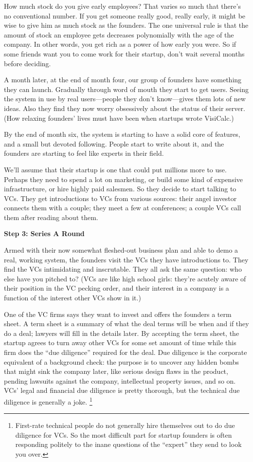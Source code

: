 \documentclass[12pt]{book}
\begin{document}
How much stock do you give early employees? That varies so much that
there's no conventional number. If you get someone really good, really
early, it might be wise to give him as much stock as the founders. The
one universal rule is that the amount of stock an employee gets
decreases polynomially with the age of the company. In other words, you
get rich as a power of how early you were. So if some friends want you
to come work for their startup, don't wait several months before
deciding.

A month later, at the end of month four, our group of founders have
something they can launch. Gradually through word of mouth they start to
get users. Seeing the system in use by real users---people they don't
know---gives them lots of new ideas. Also they find they now worry
obsessively about the status of their server. (How relaxing founders'
lives must have been when startups wrote VisiCalc.)

By the end of month six, the system is starting to have a solid core of
features, and a small but devoted following. People start to write about
it, and the founders are starting to feel like experts in their field.

We'll assume that their startup is one that could put millions more to
use. Perhaps they need to spend a lot on marketing, or build some kind
of expensive infrastructure, or hire highly paid salesmen. So they
decide to start talking to VCs. They get introductions to VCs from
various sources: their angel investor connects them with a couple; they
meet a few at conferences; a couple VCs call them after reading about
them.

\textbf{Step 3: Series A Round}

Armed with their now somewhat fleshed-out business plan and able to demo
a real, working system, the founders visit the VCs they have
introductions to. They find the VCs intimidating and inscrutable. They
all ask the same question: who else have you pitched to? (VCs are like
high school girls: they're acutely aware of their position in the VC
pecking order, and their interest in a company is a function of the
interest other VCs show in it.)

One of the VC firms says they want to invest and offers the founders a
term sheet. A term sheet is a summary of what the deal terms will be
when and if they do a deal; lawyers will fill in the details later. By
accepting the term sheet, the startup agrees to turn away other VCs for
some set amount of time while this firm does the ``due diligence''
required for the deal. Due diligence is the corporate equivalent of a
background check: the purpose is to uncover any hidden bombs that might
sink the company later, like serious design flaws in the product,
pending lawsuits against the company, intellectual property issues, and
so on. VCs' legal and financial due diligence is pretty thorough, but
the technical due diligence is generally a joke. \footnote{First-rate technical people do not generally hire themselves out
to do due diligence for VCs. So the most difficult part for startup
founders is often responding politely to the inane questions of the
``expert'' they send to look you over.}
\end{document}

